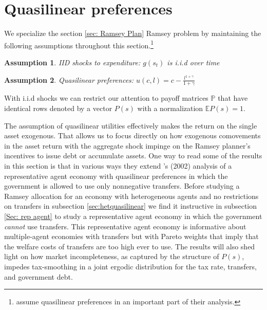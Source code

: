 \documentclass[thmsb,11pt]{article}
\newtheorem{assumption}{Assumption}
\begin{document}



\section{Quasilinear preferences}\label{Sec: quasilinear}

We specialize the section \ref{sec: Ramsey Plan} Ramsey problem by maintaining the following assumptions throughout  this
section.\footnote{\citet{Aiyagari2002} assume quasilinear preferences in an important part of
their analysis.}
\begin{assumption}
\label{ass iid}
IID shocks to expenditure: $g(s_t)$ is i.i.d over time
\end{assumption}
\begin{assumption}
\label{ass quasilinear}
Quasilinear preferences: $u(c,l)=c-\frac{l^{1+\gamma}}{1+\gamma}$
\end{assumption}
\noindent With i.i.d shocks we can restrict our attention to  payoff matrices $\mathbb{P}$ that have identical rows denoted by a vector $P(s)$
with a normalization  $\mathbb{E}P(s)=1$.

The assumption of quasilinear utilities effectively makes the return on the single asset exogenous. That allows us to focus directly on
how exogenous comovements in the asset return with the aggregate shock impinge on the Ramsey planner's incentives to issue debt or accumulate
assets.  One way to read some of the results in this section is that in various ways they extend \citeauthor{Aiyagari2002}'s (2002) analysis of a representative
agent economy with quasilinear preferences in which the government is allowed  to use only nonnegative transfers.
Before studying a Ramsey allocation for an economy with heterogeneous agents and no restrictions on transfers in subsection \ref{sec:hetquasilinear}
we find it instructive in subsection \ref{Sec: rep agent} to study a  representative agent economy in which the government \textit{cannot} use transfers.
This representative agent  economy is  informative about   multiple-agent economies with transfers but with   Pareto weights that imply that the welfare costs of  transfers are too high ever to use.
The results will also shed light on  how market incompleteness, as captured by the structure of $P(s)$, impedes  tax-smoothing  in a joint ergodic distribution for the tax rate, transfers, and government debt. 
\color{black}
\end{document}
